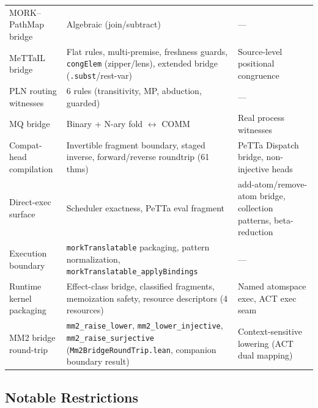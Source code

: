 \documentclass[11pt]{article}
\theoremstyle{definition}
\theoremstyle{remark}
\newcommand{\MORK}{\textup{MORK}}
\newcommand{\MeTTaIL}{\textup{MeTTaIL}}
\newcommand{\PathMap}{\textup{PathMap}}
\begin{document}
\begin{table}[ht!]
\begin{tabular}{@{}lp{5cm}p{4cm}@{}}
\MORK{}--\PathMap{} bridge     & Algebraic (join/subtract) & --- \\
\MeTTaIL{} bridge              & Flat rules, multi-premise, freshness guards, \texttt{congElem} (zipper/lens), extended bridge (\texttt{.subst}/rest-var) & Source-level positional congruence \\
PLN routing witnesses          & 6 rules (transitivity, MP, abduction, guarded) & --- \\
MQ bridge                      & Binary + N-ary fold $\leftrightarrow$ COMM & Real process witnesses \\
Compat-head compilation        & Invertible fragment boundary, staged inverse, forward/reverse roundtrip (61 thms) & PeTTa Dispatch bridge, non-injective heads \\
Direct-exec surface            & Scheduler exactness, PeTTa eval fragment & add-atom/remove-atom bridge, collection patterns, beta-reduction \\
Execution boundary             & \texttt{morkTranslatable} packaging, pattern normalization, \texttt{morkTranslatable\_applyBindings} & --- \\
Runtime kernel packaging       & Effect-class bridge, classified fragments, memoization safety, resource descriptors (4 resources) & Named atomspace exec, ACT exec seam \\
MM2 bridge round-trip          & \texttt{mm2\_raise\_lower}, \texttt{mm2\_lower\_injective}, \texttt{mm2\_raise\_surjective} (\texttt{Mm2BridgeRoundTrip.lean}, companion boundary result) & Context-sensitive lowering (ACT dual mapping) \\
\bottomrule
\end{tabular}
\end{table}

\subsection{Notable Restrictions}
\end{document}

